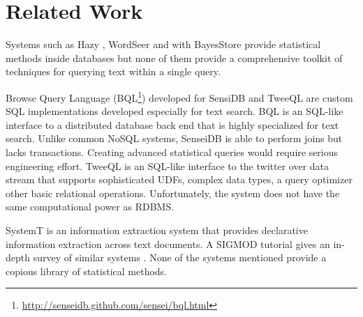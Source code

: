 
\section{Related Work}


Systems such as Hazy \cite{Koc:2011:IMC:1952376.1952380}, 
WordSeer \cite{muralidharanvisual} and with BayesStore \cite{Wang:2008:BML:1453856.1453896} provide statistical 
methods inside databases but none of them provide a 
comprehensive toolkit of techniques for querying text within a single query.


Browse Query Language (BQL\footnote{\url{http://senseidb.github.com/sensei/bql.html}}) developed for SensiDB and 
TweeQL \cite{Marcus:2012:PVD:2094114.2094120} are custom SQL
implementations developed especially for text search.
BQL is an SQL-like interface to a distributed database back end that is highly
specialized for text search. Unlike common NoSQL systems, SenseiDB is able to 
perform joins but lacks transactions. 
Creating advanced statistical queries would require serious engineering effort.
TweeQL is an SQL-like interface to the twitter over data stream that supports 
sophisticated UDFs, complex data types,
a query optimizer other basic relational operations.
Unfortunately, the system does not have the same computational power as RDBMS.

SystemT is an information extraction system that provides declarative information
extraction across text documents.
A SIGMOD tutorial gives an in-depth survey of similar systems
\cite{Chiticariu:2010:EIE:1807167.1807339}.
None of the systems mentioned provide a copious library of statistical methods.


